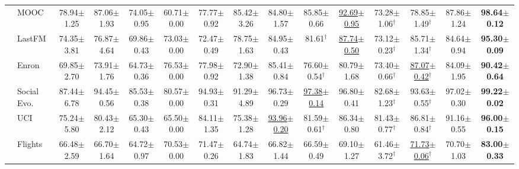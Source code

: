 \begin{table}[t]
{\begin{tabular}{llccccccccccccc}
 & MOOC & 78.94{\scriptsize$\pm$1.25} & 87.06{\scriptsize$\pm$1.93} & 74.05{\scriptsize$\pm$0.95} & 60.71{\scriptsize$\pm$0.00} & 77.77{\scriptsize$\pm$0.92} & 85.42{\scriptsize$\pm$3.26} & 84.80{\scriptsize$\pm$1.57} & 85.85{\scriptsize$\pm$0.66} & \underline{92.69{\scriptsize$\pm$0.95}} & 73.28{\scriptsize$\pm$1.06}$^\dagger$ & 78.85{\scriptsize$\pm$1.49}$^\dagger$ & 87.86{\scriptsize$\pm$1.24} & \textbf{98.64{\scriptsize$\pm$0.12}} \\
 & LastFM & 74.35{\scriptsize$\pm$3.81} & 76.87{\scriptsize$\pm$4.64} & 69.86{\scriptsize$\pm$0.43} & 73.03{\scriptsize$\pm$0.00} & 72.47{\scriptsize$\pm$0.49} & 78.75{\scriptsize$\pm$1.63} & 84.95{\scriptsize$\pm$0.43} & 81.61$^\dagger$ & \underline{87.74{\scriptsize$\pm$0.50}} & 73.12{\scriptsize$\pm$0.23}$^\dagger$ & 85.71{\scriptsize$\pm$1.34}$^\dagger$ & 84.64{\scriptsize$\pm$0.94} & \textbf{95.30{\scriptsize$\pm$0.09}} \\
 & Enron & 69.85{\scriptsize$\pm$2.70} & 73.91{\scriptsize$\pm$1.76} & 64.73{\scriptsize$\pm$0.36} & 76.53{\scriptsize$\pm$0.00} & 77.98{\scriptsize$\pm$0.92} & 72.90{\scriptsize$\pm$1.38} & 85.41{\scriptsize$\pm$0.84} & 76.60{\scriptsize$\pm$0.54}$^\dagger$ & 80.79{\scriptsize$\pm$1.68} & 73.40{\scriptsize$\pm$0.66}$^\dagger$ & \underline{87.07{\scriptsize$\pm$0.42}}$^\dagger$ & 84.09{\scriptsize$\pm$1.95} & \textbf{90.42{\scriptsize$\pm$0.64}} \\
 & Social Evo. & 87.44{\scriptsize$\pm$6.78} & 94.45{\scriptsize$\pm$0.56} & 85.53{\scriptsize$\pm$0.38} & 80.57{\scriptsize$\pm$0.00} & 94.93{\scriptsize$\pm$0.31} & 91.29{\scriptsize$\pm$4.89} & 96.73{\scriptsize$\pm$0.29} & \underline{97.38{\scriptsize$\pm$0.14}} & 96.80{\scriptsize$\pm$0.41} & 82.68{\scriptsize$\pm$1.23}$^\dagger$ & 93.63{\scriptsize$\pm$0.55}$^\dagger$ & 97.02{\scriptsize$\pm$0.30} & \textbf{99.22{\scriptsize$\pm$0.02}} \\
 & UCI & 75.24{\scriptsize$\pm$5.80} & 80.43{\scriptsize$\pm$2.12} & 65.30{\scriptsize$\pm$0.43} & 65.50{\scriptsize$\pm$0.00} & 84.11{\scriptsize$\pm$1.35} & 75.38{\scriptsize$\pm$1.28} & \underline{93.96{\scriptsize$\pm$0.20}} & 81.59{\scriptsize$\pm$0.61}$^\dagger$ & 86.34{\scriptsize$\pm$0.80} & 81.43{\scriptsize$\pm$0.77}$^\dagger$ & 86.81{\scriptsize$\pm$0.84}$^\dagger$ & 91.16{\scriptsize$\pm$0.55} & \textbf{96.00{\scriptsize$\pm$0.15}} \\
 & Flights & 66.48{\scriptsize$\pm$2.59} & 66.70{\scriptsize$\pm$1.64} & 64.72{\scriptsize$\pm$0.97} & 70.53{\scriptsize$\pm$0.00} & 71.47{\scriptsize$\pm$0.26} & 64.74{\scriptsize$\pm$1.83} & 66.82{\scriptsize$\pm$1.44} & 66.59{\scriptsize$\pm$0.49} & 69.10{\scriptsize$\pm$1.27} & 61.46{\scriptsize$\pm$3.72}$^\dagger$ & \underline{71.73{\scriptsize$\pm$0.06}}$^\dagger$ & 70.70{\scriptsize$\pm$1.03} & \textbf{83.00{\scriptsize$\pm$0.33}} \\

\end{tabular}}
\end{table}

